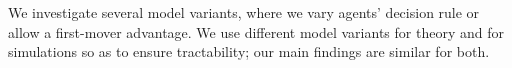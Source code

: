We investigate several model variants, where we vary agents' decision rule or allow a first-mover advantage. We use different model variants for theory and for simulations so as to ensure tractability; our main findings are similar for both.











